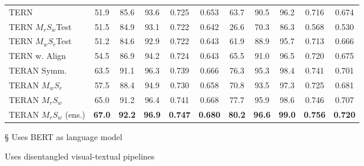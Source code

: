 \documentclass[acmsmall]{acmart}
\newcommand{\majorrevised}[1]{#1}
\begin{document}
\begin{table}[t]
\begin{threeparttable}
\begin{tabular}{LCCCCCCCCCC}
\midrule
TERN \cite{messina2020tern} & 51.9 & 85.6 & 93.6 & 0.725 & 0.653 & 63.7 & 90.5 & 96.2 & 0.716 & 0.674 \\
TERN $M_{r}S_{w}$Test & 51.5 & 84.9 & 93.1 & 0.722 & 0.642 & 26.6 & 70.3 & 86.3 &  0.568 & 0.530\\
TERN $M_{w}S_{r}$Test & 51.2 & 84.6 & 92.9 & 0.722 & 0.643 & 61.9 & 88.9 & 95.7 & 0.713 & 0.666 \\
TERN w. Align & 54.5 & 86.9 & 94.2 & 0.724 & 0.643 & 65.5 & 91.0 & 96.5 & 0.720 & 0.675\\
\midrule
TERAN Symm. & 63.5 & 91.1 & 96.3 & 0.739 & 0.666 & 76.3 & 95.3 & 98.4 & 0.741 & 0.701 \\
TERAN $M_{w}S_{r}$ & 57.5 & 88.4 & 94.9 & 0.730 & 0.658 & 70.8 & 93.5 & 97.3 & 0.725 & 0.681 \\
TERAN $M_{r}S_{w}$ & 65.0 & 91.2 & 96.4 & 0.741 & 0.668	& 77.7 & 95.9 & 98.6 & 0.746 & 0.707 \\
\majorrevised{TERAN $M_{r}S_{w}$ (ens.)} & \majorrevised{\textbf{67.0}} & \majorrevised{\textbf{92.2}} & \majorrevised{\textbf{96.9}} & \majorrevised{\textbf{0.747}} & \majorrevised{\textbf{0.680}} & \majorrevised{\textbf{80.2}} & \majorrevised{\textbf{96.6}} & \majorrevised{\textbf{99.0}} & \majorrevised{\textbf{0.756}} & \majorrevised{\textbf{0.720}} \\
\bottomrule
\end{tabular}
\label{tab:results_mscoco_1k}
\begin{tablenotes}
    \item[\S] Uses BERT as language model
    \item[\textdagger] Uses disentangled visual-textual pipelines
\end{tablenotes}
\end{threeparttable}
\end{table}
\end{document}
